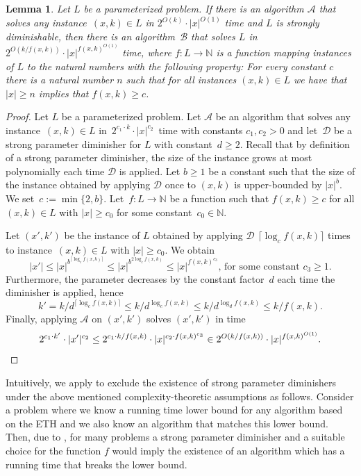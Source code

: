 \documentclass[11pt,a4,USenglish]{article}
\newcommand{\ETH}{\textnormal{ETH}}
\theoremstyle{definition}
\theoremstyle{plain}
\newtheorem{lem}{Lemma}
\theoremstyle{remark}
\newcommand{\calD}{\mathcal{D}}
\newcommand{\calA}{\mathcal{A}}
\newcommand{\calB}{\mathcal{B}}
\newcommand{\N}{\mathbb{N}}
\begin{document}
\begin{lem}%
\label{lem:strdim}
  Let $L$ be a parameterized problem.
  If there is an algorithm $\calA$ that solves any instance~$(x,k)\in L$ in $2^{O(k)}\cdot |x|^{O(1)}$ time and $L$ is strongly diminishable, 
  then there is an algorithm~$\calB$ that solves $L$ in $2^{O(k/ f(x, k))}\cdot |x|^{f(x, k)^{O(1)}}$ time, where $f:L\to \N$ is a function mapping instances of $L$ to the natural numbers with the following property: For every constant $c$ there is a natural number $n$ such that for all instances $(x, k)\in L$ we have that $|x|\ge n$ implies that $f(x, k)\ge c$.
\end{lem}
%
%
{
  \newcommand{\cmin}{c}
  \begin{proof}
    Let $L$ be a parameterized problem. 
    Let $\calA$ be an algorithm that solves any instance~$(x,k)\in L$ in~$2^{c_1\cdot k}\cdot |x|^{c_2}$~time with constants $c_1,c_2>0$ and let~$\calD$ be a strong parameter diminisher for $L$ with constant~$d\geq 2$.
    Recall that by definition of a strong parameter diminisher, the size of the instance grows at most polynomially each time $\calD$ is applied. 
    Let $b\geq 1$ be a constant such that the size of the instance obtained by applying $\calD$ once to  $(x,k)$ is upper-bounded by $|x|^b$.
    We set~$\cmin:=\min\{2,b\}$.
    Let~$f:L\to\N$ be a function such that $f(x, k)\ge c$ for all $(x, k)\in L$ with $|x|\ge c_0$ for some constant~$c_0\in\N$. 
    
    Let $(x',k')$ be the instance of $L$ obtained by applying $\calD$ $\lceil\log_{\cmin} f(x,k)\rceil$ times to instance~$(x,k)\in L$ with $|x|\geq c_0$.
    We obtain 
    \[ |x'| \leq |x|^{b^{\lceil\log_{\cmin} f(x,k)\rceil}} \leq |x|^{b^{2\log_{\cmin} f(x,k)}} \leq |x|^{f(x,k)^{c_3}},\, \text{for some constant $c_3\geq 1$.} \]
    Furthermore, the parameter decreases by the constant factor~$d$ each time the diminisher is applied, hence 
    \[ k' = k/d^{\lceil\log_{\cmin} f(x,k)\rceil}\leq  k/d^{\log_{\cmin} f(x,k)} \leq k/d^{\log_{d} f(x,k)}\leq k/f(x,k) . \] 
    Finally, applying $\calA$ on $(x', k')$ solves $(x',k')$ in time 
    \[2^{c_1\cdot k'}\cdot |x'|^{c_2} \leq  2^{c_1\cdot k/f(x,k)}\cdot |x|^{c_2\cdot f(x,k)^{c_3}} \in 2^{O(k/ f(x,k))}\cdot |x|^{f(x,k)^{O(1)}}.\qedhere\] %
  \end{proof}
}
%
Intuitively, we apply  to exclude the existence of strong parameter diminishers under the above mentioned complexity-theoretic assumptions as follows.
Consider a problem where we know a running time lower bound for any algorithm based on the \ETH{} and we also know an algorithm that matches this lower bound.
Then, due to , for many problems a strong parameter diminisher and a suitable choice for the function $f$ would imply the existence of an algorithm which has a running time that breaks the lower bound.
%
\end{document}
